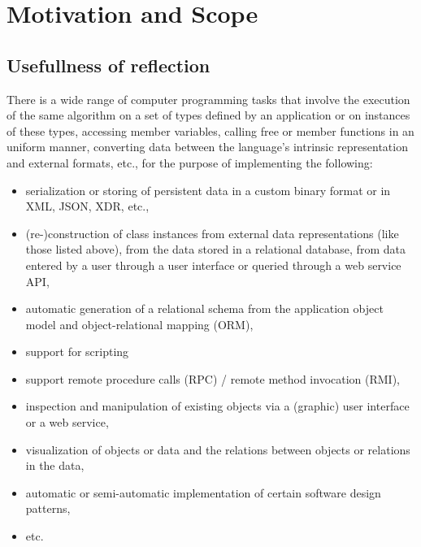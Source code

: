
\section{Motivation and Scope}

\subsection{Usefullness of reflection}

There is a wide range of computer programming tasks that involve
the execution of the same algorithm on a set of types defined by an
application or on instances of these types, accessing member variables,
calling free or member functions in an uniform
manner, converting data between the language's intrinsic representation and
external formats, etc., for the purpose of implementing the following:

\begin{itemize}

\item serialization or storing of persistent data in a
custom binary format or in XML, JSON, XDR, etc.,

\item (re-)construction of class instances
from external data representations (like those listed above),
from the data stored in a relational database, from data entered by
a user through a user interface or queried through a web service API,

\item automatic generation of a relational schema from the application
object model and object-relational mapping (ORM),

\item support for scripting 

\item support remote procedure calls (RPC) / remote method invocation (RMI),

\item inspection and manipulation of existing objects via a (graphic) user interface
or a web service,

\item visualization of objects or data and the relations between objects or
relations in the data,

\item automatic or semi-automatic implementation of certain software design patterns,

\item etc.

\end{itemize}

